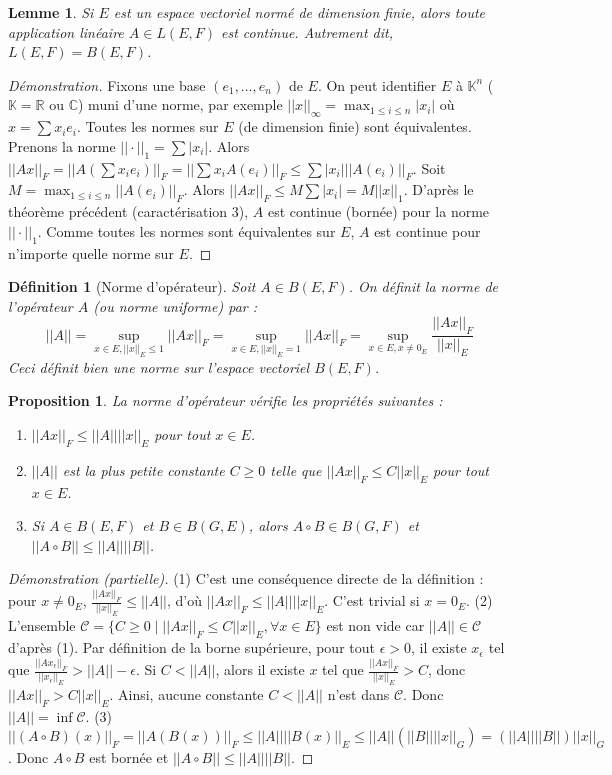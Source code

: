 \documentclass{article}
\newtheorem{lemma}{Lemme}
\newtheorem{proposition}[theorem]{Proposition}
\newtheorem{definition}{Définition}
\begin{document}
\begin{lemma}
Si $E$ est un espace vectoriel normé de dimension finie, alors toute application linéaire $A \in L(E, F)$ est continue. Autrement dit, $L(E, F) = B(E, F)$.
\end{lemma}
\begin{proof}[Démonstration]
Fixons une base $(e_1, \dots, e_n)$ de $E$. On peut identifier $E$ à $\mathbb{K}^n$ ($\mathbb{K}=\mathbb{R}$ ou $\mathbb{C}$) muni d'une norme, par exemple $||x||_\infty = \max_{1\le i \le n} |x_i|$ où $x = \sum x_i e_i$. Toutes les normes sur $E$ (de dimension finie) sont équivalentes. Prenons la norme $||\cdot||_1 = \sum |x_i|$.
Alors $||Ax||_F = ||A(\sum x_i e_i)||_F = ||\sum x_i A(e_i)||_F \le \sum |x_i| ||A(e_i)||_F$.
Soit $M = \max_{1\le i \le n} ||A(e_i)||_F$. Alors $||Ax||_F \le M \sum |x_i| = M ||x||_1$.
D'après le théorème précédent (caractérisation 3), $A$ est continue (bornée) pour la norme $||\cdot||_1$. Comme toutes les normes sont équivalentes sur $E$, $A$ est continue pour n'importe quelle norme sur $E$.
\proofbox
\end{proof}

\begin{definition}[Norme d'opérateur]
Soit $A \in B(E, F)$. On définit la norme de l'opérateur $A$ (ou norme uniforme) par :
\[
||A|| = \sup_{x \in E, ||x||_E \le 1} ||Ax||_F = \sup_{x \in E, ||x||_E = 1} ||Ax||_F = \sup_{x \in E, x \ne 0_E} \frac{||Ax||_F}{||x||_E}
\]
Ceci définit bien une norme sur l'espace vectoriel $B(E, F)$.
\end{definition}

\begin{proposition}
La norme d'opérateur vérifie les propriétés suivantes :
\begin{enumerate}
    \item $||Ax||_F \le ||A|| ||x||_E$ pour tout $x \in E$.
    \item $||A||$ est la plus petite constante $C \ge 0$ telle que $||Ax||_F \le C ||x||_E$ pour tout $x \in E$.
    \item Si $A \in B(E, F)$ et $B \in B(G, E)$, alors $A \circ B \in B(G, F)$ et $||A \circ B|| \le ||A|| ||B||$.
\end{enumerate}
\end{proposition}
\begin{proof}[Démonstration (partielle)]
(1) C'est une conséquence directe de la définition : pour $x \ne 0_E$, $\frac{||Ax||_F}{||x||_E} \le ||A||$, d'où $||Ax||_F \le ||A|| ||x||_E$. C'est trivial si $x=0_E$.
(2) L'ensemble $\mathcal{C} = \{ C \ge 0 \mid ||Ax||_F \le C ||x||_E, \forall x \in E \}$ est non vide car $||A|| \in \mathcal{C}$ d'après (1). Par définition de la borne supérieure, pour tout $\epsilon > 0$, il existe $x_\epsilon$ tel que $\frac{||Ax_\epsilon||_F}{||x_\epsilon||_E} > ||A|| - \epsilon$. Si $C < ||A||$, alors il existe $x$ tel que $\frac{||Ax||_F}{||x||_E} > C$, donc $||Ax||_F > C ||x||_E$. Ainsi, aucune constante $C < ||A||$ n'est dans $\mathcal{C}$. Donc $||A|| = \inf \mathcal{C}$.
(3) $||(A \circ B)(x)||_F = ||A(B(x))||_F \le ||A|| ||B(x)||_E \le ||A|| (||B|| ||x||_G) = (||A|| ||B||) ||x||_G$. Donc $A \circ B$ est bornée et $||A \circ B|| \le ||A|| ||B||$.
\end{proof}
\end{document}
